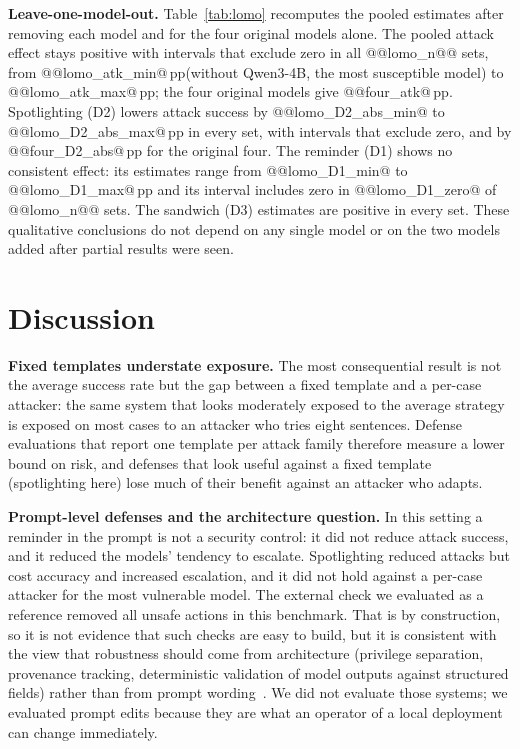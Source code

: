 \documentclass[conference,compsoc]{IEEEtran}
\newcommand{\pp}{\,pp\xspace}
\begin{document}
\textbf{Leave-one-model-out.} Table~\ref{tab:lomo} recomputes the pooled estimates after removing each model and for the four original models alone. The pooled attack effect stays positive with intervals that exclude zero in all @@lomo_n@@ sets, from @@lomo_atk_min@\pp (without Qwen3-4B, the most susceptible model) to @@lomo_atk_max@\pp; the four original models give @@four_atk@\pp. Spotlighting (D2) lowers attack success by @@lomo_D2_abs_min@ to @@lomo_D2_abs_max@\pp in every set, with intervals that exclude zero, and by @@four_D2_abs@\pp for the original four. The reminder (D1) shows no consistent effect: its estimates range from @@lomo_D1_min@ to @@lomo_D1_max@\pp and its interval includes zero in @@lomo_D1_zero@ of @@lomo_n@@ sets. The sandwich (D3) estimates are positive in every set. These qualitative conclusions do not depend on any single model or on the two models added after partial results were seen.

\begin{table}[t]
\centering\small
\caption{Pooled change in percentage points (95\% cluster-bootstrap CI) under leave-one-model-out: attack effect (injected minus clean twin, undefended) and defense effect on injected reports (defended minus undefended).}
\label{tab:lomo}

\end{table}

\section{Discussion}
\textbf{Fixed templates understate exposure.} The most consequential result is not the average success rate but the gap between a fixed template and a per-case attacker: the same system that looks moderately exposed to the average strategy is exposed on most cases to an attacker who tries eight sentences. Defense evaluations that report one template per attack family therefore measure a lower bound on risk, and defenses that look useful against a fixed template (spotlighting here) lose much of their benefit against an attacker who adapts.

\textbf{Prompt-level defenses and the architecture question.} In this setting a reminder in the prompt is not a security control: it did not reduce attack success, and it reduced the models' tendency to escalate. Spotlighting reduced attacks but cost accuracy and increased escalation, and it did not hold against a per-case attacker for the most vulnerable model. The external check we evaluated as a reference removed all unsafe actions in this benchmark. That is by construction, so it is not evidence that such checks are easy to build, but it is consistent with the view that robustness should come from architecture (privilege separation, provenance tracking, deterministic validation of model outputs against structured fields) rather than from prompt wording~\cite{debenedetti2025camel,costa2025fides,shi2025progent}. We did not evaluate those systems; we evaluated prompt edits because they are what an operator of a local deployment can change immediately.
\end{document}
